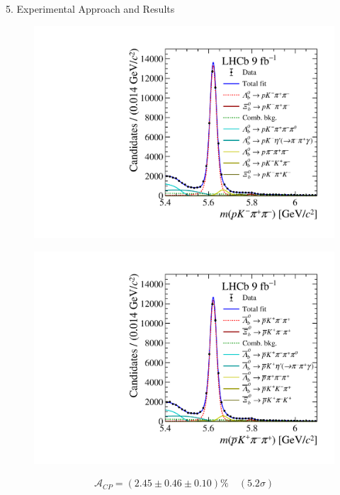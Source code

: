 \documentclass[xcolor=dvipsnames]{beamer}
\def\s{\sigma}
\begin{document}
\begin{frame}{5. Experimental Approach and Results}
\begin{minipage}[t]{0.45\textwidth}
\begin{figure}
    \centering
    \includegraphics[width=\linewidth]{Fig2a.pdf}
\end{figure}
\end{minipage}
\begin{minipage}[t]{0.45\textwidth}
\begin{figure}
    \centering
    \includegraphics[width=\linewidth]{Fig2b.pdf}
\end{figure}
\end{minipage}
\begin{align*}
    \mathcal{A}_{CP}=(2.45\pm0.46\pm0.10)\% \quad (5.2\s)
\end{align*}
\end{frame}
\end{document}
